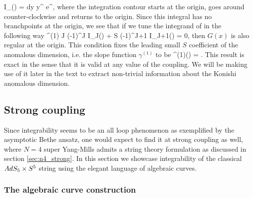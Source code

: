 \beq
	I_\nu(\Lambda) =  \oint dy \; y^{} e^{\Lambda {}},
\eeq
where the integration contour starts at the origin, goes around counter-clockwise and returns to the origin. 
Since this integral has no branchpoints at the origin, we see that if we tune the integrand of  in the following way
\beq
	\gamma^{(1)} J (-1)^J I_J(\Lambda) + \Lambda S (-1)^{J+1} I_{J+1}(\Lambda) = 0,
\eeq
then $G(x)$ is also regular at the origin. 
This condition fixes the leading small $S$ coefficient of the anomalous dimension, i.e. the slope function $\gamma^{(1)}$ to be
\beq
	\gamma^{(1)}(\Lambda) =  .
\eeq
This result is exact in the sense that it is valid at any value of the coupling.
We will be making use of it later in the text to extract non-trivial information about the Konishi anomalous dimension.

\subsection{Strong coupling}

Since integrability seems to be an all loop phenomenon as exemplified by the asymptotic Bethe ansatz, one would expect to find it at strong coupling as well, where $N=4$ super Yang-Mills admits a string theory formulation as discussed in section \ref{sec:n4_strong}. 
In this section we showcase integrability of the classical $AdS_5 \times S^5$ string using the elegant language of algebraic curves. 

\subsubsection{The algebraic curve construction}

